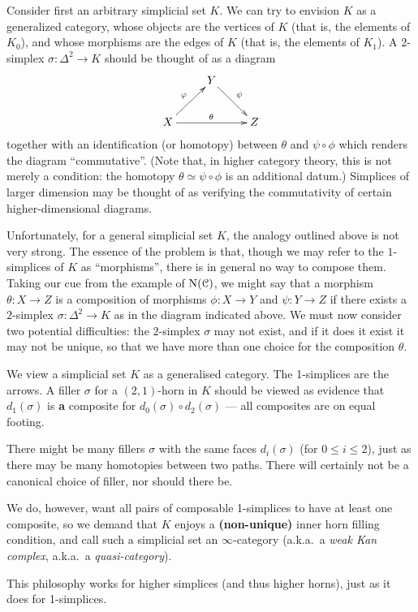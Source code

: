 Consider first an arbitrary simplicial set $K$. We can try to envision $K$ as a generalized category, whose objects are the vertices of $K$ (that is, the elements of $K_0$), and whose morphisms are the edges of $K$ (that is, the elements of $K_1$). A $2$-simplex
$\sigma: \Delta^2 \rightarrow K$ should be thought of as a diagram
$$ \xymatrix{ & Y \ar[dr]^{\psi} & \\
X \ar[ur]^{\phi} \ar[rr]^{\theta} & & Z }$$
together with an identification (or homotopy) between $\theta$ and $\psi \circ \phi$
which renders the diagram ``commutative''. (Note that, in higher category theory, 
this is not merely a condition: the homotopy $\theta \simeq \psi \circ \phi$ is an additional datum.)
Simplices of larger dimension may be thought of as verifying the
commutativity of certain higher-dimensional diagrams.

Unfortunately, for a general simplicial set $K$, the analogy
outlined above is not very strong. The essence of the problem is that, though we may refer
to the $1$-simplices of $K$ as ``morphisms'', there is in general no way to compose them.
Taking our cue from the example of $\operatorname{N}(\operatorname{\mathcal{C}})$,
we might say that a morphism $\theta:X \rightarrow Z$ is a composition of morphisms
$\phi: X \rightarrow Y$ and $\psi: Y \rightarrow Z$ if there exists a $2$-simplex
$\sigma: \Delta^2 \rightarrow K$ as in the diagram indicated above. 
We must now consider two potential difficulties: the $2$-simplex $\sigma$ may not exist, and
if it does it exist it may not be unique, so that we have more than one choice for the composition $\theta$.
\begin{shaded}
We view a simplicial set $K$ as a generalised category. The 1-simplices are the arrows. A filler $\sigma$ for a $(2,1)$-horn in $K$ should be viewed as evidence that $d_1(\sigma)$ is \textbf{a} composite for $d_0(\sigma)\circ d_2(\sigma)$ --- all composites are on equal footing.

There might be many fillers $\sigma$ with the same faces $d_i(\sigma)$ (for $0\leq i\leq2$), just as there may be many homotopies between two paths. There will certainly not be a canonical choice of filler, nor should there be.

We do, however, want all pairs of composable 1-simplices to have at least one composite, so we demand that $K$ enjoys a \textbf{(non-unique)} inner horn filling condition, and call such a simplicial set an $\infty$-category (a.k.a.\ a \textit{weak Kan complex}, a.k.a.\ a \textit{quasi-category}).

This philosophy works for higher simplices (and thus higher horns), just as it does for 1-simplices.
\end{shaded}

